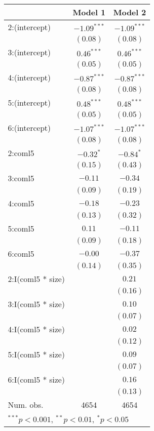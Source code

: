 
\begin{table}
\tiny
\begin{center}
\begin{tabular}{l c c }
\hline
 & Model 1 & Model 2 \\
\hline
2:(intercept)     & $-1.09^{***}$ & $-1.09^{***}$ \\
                  & $(0.08)$      & $(0.08)$      \\
3:(intercept)     & $0.46^{***}$  & $0.46^{***}$  \\
                  & $(0.05)$      & $(0.05)$      \\
4:(intercept)     & $-0.87^{***}$ & $-0.87^{***}$ \\
                  & $(0.08)$      & $(0.08)$      \\
5:(intercept)     & $0.48^{***}$  & $0.48^{***}$  \\
                  & $(0.05)$      & $(0.05)$      \\
6:(intercept)     & $-1.07^{***}$ & $-1.07^{***}$ \\
                  & $(0.08)$      & $(0.08)$      \\
2:coml5           & $-0.32^{*}$   & $-0.84^{*}$   \\
                  & $(0.15)$      & $(0.43)$      \\
3:coml5           & $-0.11$       & $-0.34$       \\
                  & $(0.09)$      & $(0.19)$      \\
4:coml5           & $-0.18$       & $-0.23$       \\
                  & $(0.13)$      & $(0.32)$      \\
5:coml5           & $0.11$        & $-0.11$       \\
                  & $(0.09)$      & $(0.18)$      \\
6:coml5           & $-0.00$       & $-0.37$       \\
                  & $(0.14)$      & $(0.35)$      \\
2:I(coml5 * size) &               & $0.21$        \\
                  &               & $(0.16)$      \\
3:I(coml5 * size) &               & $0.10$        \\
                  &               & $(0.07)$      \\
4:I(coml5 * size) &               & $0.02$        \\
                  &               & $(0.12)$      \\
5:I(coml5 * size) &               & $0.09$        \\
                  &               & $(0.07)$      \\
6:I(coml5 * size) &               & $0.16$        \\
                  &               & $(0.13)$      \\
\hline
Num. obs.         & 4654          & 4654          \\
\hline
\multicolumn{3}{l}{\scriptsize{$^{***}p<0.001$, $^{**}p<0.01$, $^*p<0.05$}}
\end{tabular}
\end{center}
\end{table}
